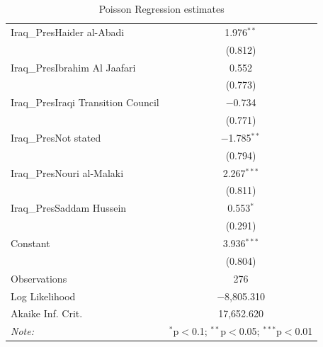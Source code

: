 \begin{table}[ht]
\begin{adjustbox}{width=1\textwidth}
\begin{tabular}{@{\extracolsep{2pt}}lc}
 Iraq\_PresHaider al-Abadi & 1.976$^{**}$ \\ 
  & (0.812) \\ 
 Iraq\_PresIbrahim Al Jaafari & 0.552 \\ 
  & (0.773) \\ 
 Iraq\_PresIraqi Transition Council & $-$0.734 \\ 
  & (0.771) \\ 
 Iraq\_PresNot stated & $-$1.785$^{**}$ \\ 
  & (0.794) \\ 
 Iraq\_PresNouri al-Malaki & 2.267$^{***}$ \\ 
  & (0.811) \\ 
 Iraq\_PresSaddam Hussein & 0.553$^{*}$ \\ 
  & (0.291) \\ 
 Constant & 3.936$^{***}$ \\ 
  & (0.804) \\ 
Observations & 276 \\ 
Log Likelihood & $-$8,805.310 \\ 
Akaike Inf. Crit. & 17,652.620 \\ 
\hline 
\textit{Note:}  & \multicolumn{1}{r}{$^{*}$p$<$0.1; $^{**}$p$<$0.05; $^{***}$p$<$0.01} \\ 
\end{tabular}
\end{adjustbox} 
\caption{Poisson Regression estimates} 
\end{table}


